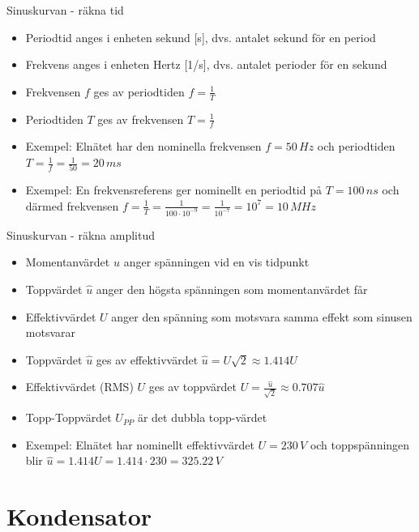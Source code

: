 \documentclass{beamer}
\begin{document}
\begin{frame}{Sinuskurvan - räkna tid}
  \begin{itemize}
  \item Periodtid anges i enheten sekund [s], dvs. antalet sekund för en period
  \item Frekvens anges i enheten Hertz [1/s], dvs. antalet perioder för en sekund
  \item Frekvensen $f$ ges av periodtiden $f = \frac{1}{T}$
  \item Periodtiden $T$ ges av frekvensen $T = \frac{1}{f}$
  \item Exempel: Elnätet har den nominella frekvensen $f=50\,Hz$ och periodtiden $T=\frac{1}{f}=\frac{1}{50}=20\,ms$
  \item Exempel: En frekvensreferens ger nominellt en periodtid på $T=100\,ns$ och därmed frekvensen $f=\frac{1}{T}=\frac{1}{100\cdot10^{-9}}=\frac{1}{10^{-7}}=10^7=10\,MHz$
  \end{itemize}
\end{frame}

\begin{frame}{Sinuskurvan - räkna amplitud}
  \begin{itemize}
  \item Momentanvärdet $u$ anger spänningen vid en vis tidpunkt
  \item Toppvärdet $\hat{u}$ anger den högsta spänningen som momentanvärdet får
  \item Effektivvärdet $U$ anger den spänning som motsvara samma effekt som sinusen motsvarar
  \item Toppvärdet $\hat{u}$ ges av effektivvärdet $\hat{u} = U\sqrt{2} \approx 1.414 U$
  \item Effektivvärdet (RMS) $U$ ges av toppvärdet $U = \frac{\hat{u}}{\sqrt{2}} \approx 0.707 \hat{u}$
  \item Topp-Toppvärdet $U_{PP}$ är det dubbla topp-värdet
  \item Exempel: Elnätet har nominellt effektivvärdet $U=230\,V$ och toppspänningen blir $\hat{u} = 1.414U = 1.414\cdot230 = 325.22\,V$
  \end{itemize}
\end{frame}

\section{Kondensator}
\end{document}
